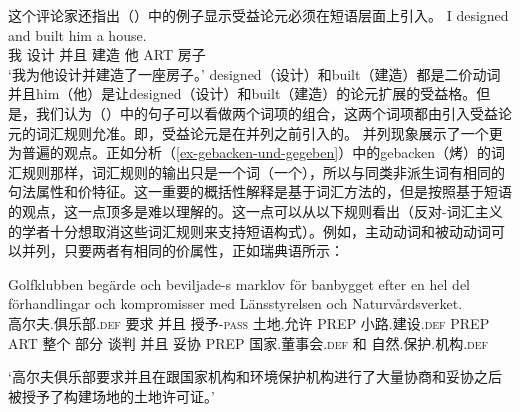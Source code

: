     这个评论家还指出（）中的例子显示受益论元必须在短语层面上引入。
\ea
\gll I designed and built him a house.\\
     我  设计 并且 建造 他 ART 房子\\
\glt `我为他设计并建造了一座房子。'  
\z
designed（设计）和built（建造）都是二价动词并且him（他）是让designed（设计）和built（建造）的论元扩展的受益格。但是，我们认为（）中的句子可以看做两个词项的组合，这两个词项都由引入受益论元的词汇规则允准。即，受益论元是在并列之前引入的。
    并列现象展示了一个更为普遍的观点。正如分析（\ref{ex-gebacken-und-gegeben}）中的gebacken（烤）的词汇规则那样，词汇规则的输出只是一个词（一个\xzeroc），所以与同类非派生词有相同的句法属性和价特征。这一重要的概括性解释是基于词汇方法的，但是按照基于短语的观点，这一点顶多是难以理解的。这一点可以从以下规则看出（反对-词汇主义的学者十分想取消这些词汇规则来支持短语构式）。例如，主动动词和被动动词可以并列，只要两者有相同的价属性，正如瑞典语所示：
\ea
{\raggedright
\gll Golfklubben beg\"arde och beviljade-s marklov f\"or banbygget efter en hel del f\"orhandlingar och kompromisser med L\"ansstyrelsen och 
Naturv\aa rdsverket.\footnotemark\\
高尔夫.俱乐部.\textsc{def} 要求 并且 授予-\textsc{pass} 土地.允许 PREP 小路.建设.\textsc{def} PREP ART 整个 部分 谈判 并且 妥协 PREP 国家.董事会.\textsc{def} 和 自然.保护.机构.\textsc{def} \\
\par}
\glt `高尔夫俱乐部要求并且在跟国家机构和环境保护机构进行了大量协商和妥协之后被授予了构建场地的土地许可证。'
